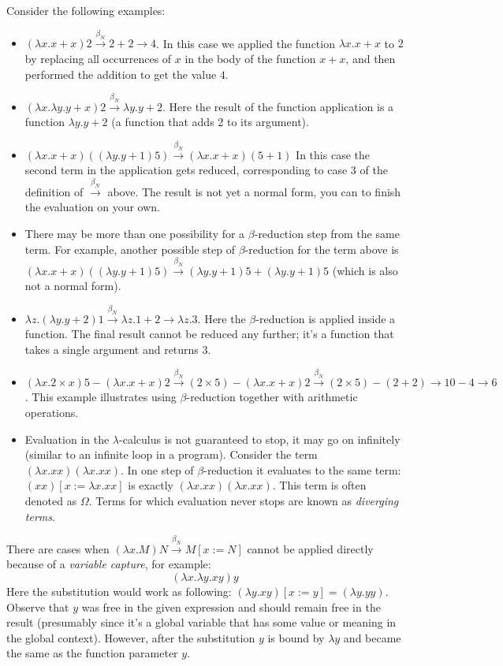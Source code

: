 \documentclass{article}
\newcommand{\lam}{\lambda}
\newcommand{\cbnb}{\overset{\beta_{N}}{\rightarrow}}
\begin{document}
Consider the following examples:
\begin{itemize}
\item $(\lam x. x + x) 2 \cbnb 2 + 2 \rightarrow 4$. In this case we applied the function $\lam x. x + x$ to $2$ by replacing all occurrences of $x$ in the body of the function $x + x$, and then performed the addition to get the value $4$. 
\item $(\lam x. \lam y. y + x) 2 \cbnb \lam y. y + 2$. Here the result of the function application is a function $\lam y. y + 2$ (a function that adds 2 to its argument).
\item  $(\lam x. x + x)((\lam y. y + 1) 5) \cbnb (\lam x. x + x) (5 + 1)$ In this case the second term in the application gets reduced, corresponding to case 3 of the definition of $\cbnb$ above. The result is not yet a normal form, you can to finish the evaluation on your own.
\item There may be more than one possibility for a $\beta$-reduction step from the same term. For example, another possible step of  $\beta$-reduction for the term above is $(\lam x. x + x)((\lam y. y + 1) 5) \cbnb (\lam y. y + 1) 5 + (\lam y. y + 1) 5$ (which is also not a normal form).
\item $\lam z. (\lam y. y + 2) 1 \cbnb \lam z. 1 + 2 \rightarrow \lam z. 3$. Here the $\beta$-reduction is applied inside a function. The final result cannot be reduced any further; it's a function that takes a single argument and returns $3$.
\item $(\lam x. 2 \times x) 5 - (\lam x. x + x) 2 \cbnb (2 \times 5) -  (\lam x. x + x) 2 \cbnb (2 \times 5) - (2 + 2) \rightarrow 10 - 4 \rightarrow 6$. This example illustrates using $\beta$-reduction together with arithmetic operations. 
\item Evaluation in the $\lam$-calculus is not guaranteed to stop, it may go on infinitely (similar to an infinite loop in a program). Consider the term $(\lam x. xx)(\lam x. xx)$. In one step of $\beta$-reduction it evaluates to the same term:  $(x x) [x := \lam x. x x]$ is exactly $(\lam x. xx)(\lam x. xx)$. This term is often denoted as $\Omega$. Terms for which evaluation never stops are known as \textit{diverging terms}. 
\end{itemize}

There are cases when $(\lam x. M) N \cbnb M [ x := N]$ cannot be applied directly because of a \textit{variable capture}, for example:
$$
(\lam x. \lam y.  x y) y
$$
Here the substitution would work as following: $(\lam y.  x y) [x := y] = (\lam y. y y)$. Observe that $y$ was free in the given expression and should remain free in the result (presumably since it's a global variable that has some value or meaning in the global context). However, after the substitution $y$ is bound by $\lam y$ and became the same as the function parameter $y$. 
\end{document}
